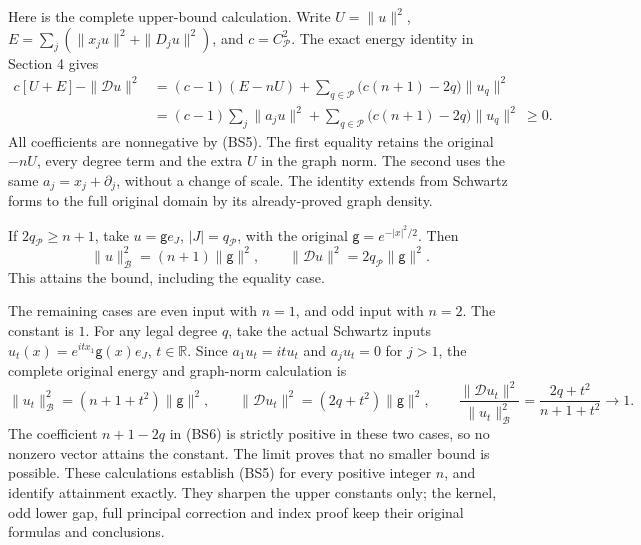 \documentclass[
  11pt,
]{article}
\begin{document}
Here is the complete upper-bound calculation. Write \(U=\|u\|^2\),
\(E=\sum_j(\|x_ju\|^2+\|D_ju\|^2)\), and \(c=C_{\mathcal P}^2\). The
exact energy identity in Section 4 gives \[
 \begin{aligned}
 c\left[U+E\right]-\|\mathcal Du\|^2
 &= (c-1)(E-nU)+
       \sum_{q\in\mathcal P}\bigl(c(n+1)-2q\bigr)\|u_q\|^2\\
 &= (c-1)\sum_j\|a_ju\|^2+
       \sum_{q\in\mathcal P}\bigl(c(n+1)-2q\bigr)\|u_q\|^2
 \ \ge0 .
 \end{aligned}
 \tag{BS6}
\] All coefficients are nonnegative by (BS5). The first equality retains
the original \(-nU\), every degree term and the extra \(U\) in the graph
norm. The second uses the same \(a_j=x_j+\partial_j\), without a change
of scale. The identity extends from Schwartz forms to the full original
domain by its already-proved graph density.

If \(2q_{\mathcal P}\ge n+1\), take \(u=\mathsf g e_J\),
\(|J|=q_{\mathcal P}\), with the original \(\mathsf g=e^{-|x|^2/2}\).
Then \[
 \|u\|_{\mathcal B}^2=(n+1)\|\mathsf g\|^2,\qquad
 \|\mathcal Du\|^2=2q_{\mathcal P}\|\mathsf g\|^2 .
 \tag{BS7}
\] This attains the bound, including the equality case.

The remaining cases are even input with \(n=1\), and odd input with
\(n=2\). The constant is \(1\). For any legal degree \(q\), take the
actual Schwartz inputs \(u_t(x)=e^{itx_1}\mathsf g(x)e_J\),
\(t\in\mathbb R\). Since \(a_1u_t=it u_t\) and \(a_ju_t=0\) for \(j>1\),
the complete original energy and graph-norm calculation is \[
 \|u_t\|_{\mathcal B}^2=(n+1+t^2)\|\mathsf g\|^2,\qquad
 \|\mathcal Du_t\|^2=(2q+t^2)\|\mathsf g\|^2,\qquad
 \frac{\|\mathcal Du_t\|^2}{\|u_t\|_{\mathcal B}^2}
 =\frac{2q+t^2}{n+1+t^2}\longrightarrow1 .
 \tag{BS8}
\] The coefficient \(n+1-2q\) in (BS6) is strictly positive in these two
cases, so no nonzero vector attains the constant. The limit proves that
no smaller bound is possible. These calculations establish (BS5) for
every positive integer \(n\), and identify attainment exactly. They
sharpen the upper constants only; the kernel, odd lower gap, full
principal correction and index proof keep their original formulas and
conclusions.
\end{document}
